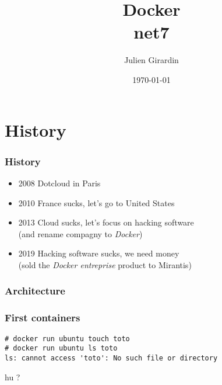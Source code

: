 \documentclass{beamer}
\title{Docker \\
       net7}
\author{Julien Girardin}
\date{\today}
\begin{document}
\maketitle{}

\section{History}

\begin{frame}
    \frametitle{History}
    \begin{itemize}
        \item 2008 Dotcloud in Paris
        \item 2010 France sucks, let's go to United States
        \item 2013 Cloud sucks, let's focus on hacking software \\
           (and rename compagny to {\it Docker})
        \item 2019 Hacking software sucks, we need money \\
           (sold the {\it Docker entreprise} product to Mirantis)
  \end{itemize}
\end{frame}


\begin{frame}
    \frametitle{Architecture}
    \begin{center}
    \end{center}
\end{frame}


\begin{frame}[fragile]
    \frametitle{First containers}
    \begin{verbatim}
# docker run ubuntu touch toto
# docker run ubuntu ls toto
ls: cannot access 'toto': No such file or directory
    \end{verbatim}
    \vfill
    hu ?
    \vfill
\end{frame}
\end{document}
